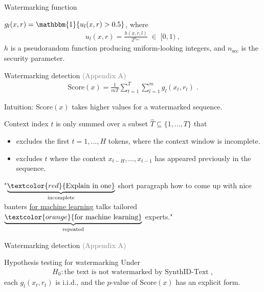 \documentclass[aspectratio=169,11pt]{beamer}
\newcommand{\gray}[1]{\textcolor{gray}{#1}}
\newcommand{\ind}{\mathbbm{1}}
\begin{document}
\begin{frame}[t]{Watermarking function}
    \vfill
    \begin{example}
        $g_l(x, r) = \ind\{u_l(x, r) > 0.5\}$, where 
        \begin{align*}
            u_l(x, r) = \frac{h(x, r, l)}{2^{n_{\text{sec}}}} \;\in\; [0, 1) \;,
        \end{align*}
        $h$ is a pseudorandom function producing uniform-looking integers, and $n_{\text{sec}}$ is the security parameter.
    \end{example}
    \vfill
    
\end{frame}

\begin{frame}[t]{Watermarking detection \gray{(Appendix A)}}
    \begin{align*}
        \mathrm{Score}(x) = \frac{1}{mT} \sum_{t=1}^T \sum_{l=1}^m g_l(x_t, r_t) \;.
    \end{align*}
    
    \begin{block}{}
        Intuition: $\mathrm{Score}(x)$ takes higher values for a watermarked sequence.
    \end{block}

    Context index $t$ is only summed over a subset $\hat{T} \subseteq \{1, \ldots, T\}$ that
    \begin{itemize}
        \item excludes the first $t = 1, \ldots, H$ tokens, where the context window is incomplete.
        \item excludes $t$ where the context $x_{t-H}, \ldots, x_{t-1}$ has appeared previously in the sequence.
    \end{itemize}

    \begin{example}[$H = 3$]
        {\footnotesize
        "$\underbrace{\textcolor{red}{\text{Explain in one}}}_{\text{\scriptsize incomplete}}$ short paragraph how to come up with nice banters \underline{for machine learning} talks tailored $\underbrace{\textcolor{orange}{\text{for machine learning}}}_{\text{\scriptsize repeated}}$ experts."
        }
    \end{example}

\end{frame}

\begin{frame}[t]{Watermarking detection \gray{(Appendix A)}}
    \vfill
    \begin{block}{Hypothesis testing for watermarking}
        Under 
        \begin{align*}
            H_0: \text{the text is not watermarked by SynthID-Text} \;,
        \end{align*}
        each $g_l(x_t, r_t)$ is i.i.d., and the $p$-value of $\mathrm{Score}(x)$ has an explicit form.
    \end{block}
    \vfill
\end{frame}
\end{document}
